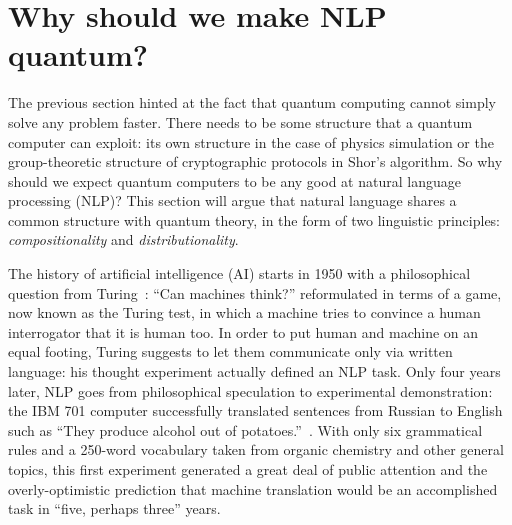 
\section*{Why should we make NLP quantum?}


The previous section hinted at the fact that quantum computing cannot
simply solve any problem faster.
There needs to be some structure that a quantum computer can exploit:
its own structure in the case of physics simulation or the group-theoretic structure of cryptographic protocols in Shor's algorithm.
So why should we expect quantum computers to be any good at natural language processing (NLP)?
This section will argue that natural language shares a common structure with quantum theory, in the form of two linguistic principles: \emph{compositionality}
and \emph{distributionality}.

The history of artificial intelligence (AI) starts in 1950 with a philosophical question from Turing~\cite{Turing50}: ``Can machines think?'' reformulated in terms of a game, now known as the Turing test, in which a machine tries to convince a human interrogator that it is human too.
In order to put human and machine on an equal footing, Turing suggests to let them communicate only via written language: his thought experiment actually defined an NLP task.
Only four years later, NLP goes from philosophical speculation to experimental demonstration: the IBM 701 computer successfully translated sentences from Russian to English such as ``They produce alcohol out of potatoes.''~\cite{Hutchins04}.
With only six grammatical rules and a 250-word vocabulary taken from organic chemistry and other general topics, this first experiment generated a great deal of public attention and the overly-optimistic prediction that machine translation would be an accomplished task in ``five, perhaps three'' years.

